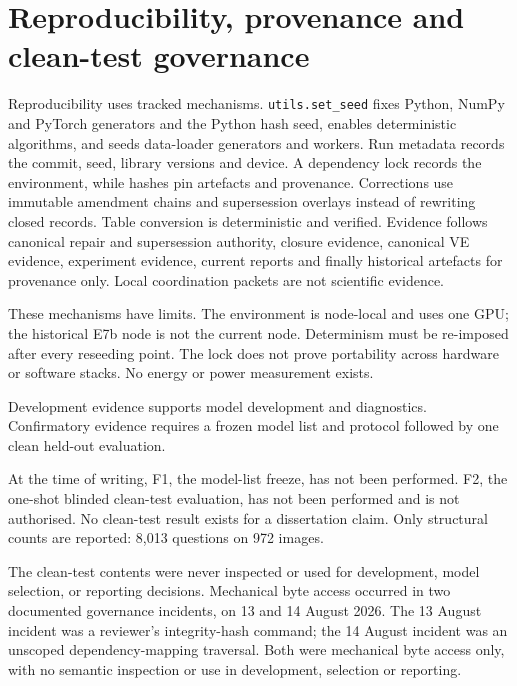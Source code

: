 \section{Reproducibility, provenance and clean-test governance}
\label{sec:ch3-governance}
Reproducibility uses tracked mechanisms. \texttt{utils.set\_seed} fixes
Python, NumPy and PyTorch generators and the Python hash seed, enables
deterministic algorithms, and seeds data-loader generators and workers. Run
metadata records the commit, seed, library versions and device. A dependency
lock records the environment, while hashes pin artefacts and provenance.
Corrections use immutable amendment chains and supersession overlays instead
of rewriting closed records. Table conversion is deterministic and verified.
Evidence follows canonical repair and supersession authority, closure evidence,
canonical VE evidence, experiment evidence, current reports and finally
historical artefacts for provenance only. Local coordination packets are not
scientific evidence.

These mechanisms have limits. The environment is node-local and uses one GPU;
the historical E7b node is not the current node. Determinism must be re-imposed
after every reseeding point. The lock does not prove portability across
hardware or software stacks. No energy or power measurement exists.

Development evidence supports model development and diagnostics. Confirmatory
evidence requires a frozen model list and protocol followed by one clean
held-out evaluation.

At the time of writing, F1, the model-list freeze, has not been performed. F2,
the one-shot blinded clean-test evaluation, has not been performed and is not
authorised. No clean-test result exists for a dissertation claim. Only
structural counts are reported: 8,013 questions on 972 images.

The clean-test contents were never inspected or used for development, model
selection, or reporting decisions. Mechanical byte access occurred in two
documented governance incidents, on 13 and 14 August 2026. The 13 August
incident was a reviewer's integrity-hash command; the 14 August incident was
an unscoped dependency-mapping traversal. Both were mechanical byte access
only, with no semantic inspection or use in development, selection or
reporting.
